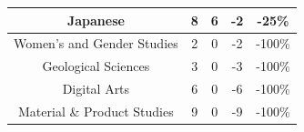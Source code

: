 \documentclass[10]{article}
\begin{document}
\begin{longtable}[c]{|ccccc|}
	\multicolumn{1}{|c|}{Japanese}                                   & \multicolumn{1}{c|}{8}                               & \multicolumn{1}{c|}{6}                                   & \multicolumn{1}{c|}{-2}                 & -25\%                 \\ \hline
	\multicolumn{1}{|c|}{Women's and Gender Studies}                 & \multicolumn{1}{c|}{2}                               & \multicolumn{1}{c|}{0}                                   & \multicolumn{1}{c|}{-2}                 & -100\%                \\ \hline
	\multicolumn{1}{|c|}{Geological Sciences}                        & \multicolumn{1}{c|}{3}                               & \multicolumn{1}{c|}{0}                                   & \multicolumn{1}{c|}{-3}                 & -100\%                \\ \hline
	\multicolumn{1}{|c|}{Digital Arts}                               & \multicolumn{1}{c|}{6}                               & \multicolumn{1}{c|}{0}                                   & \multicolumn{1}{c|}{-6}                 & -100\%                \\ \hline
	\multicolumn{1}{|c|}{Material \& Product Studies}                & \multicolumn{1}{c|}{9}                               & \multicolumn{1}{c|}{0}                                   & \multicolumn{1}{c|}{-9}                 & -100\%                \\ \hline
\end{longtable}
\end{document}
